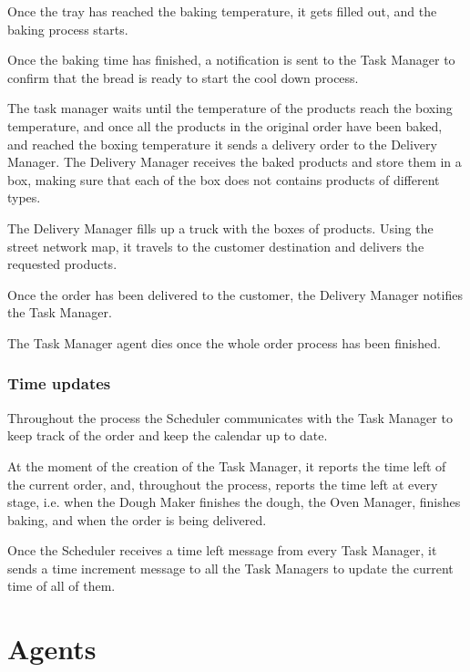 \documentclass[a4paper]{article}
\begin{document}
	Once the tray has reached the baking temperature, it gets filled out, and the baking process starts. 
	
	Once the baking time has finished, a notification is sent to the Task Manager to confirm that the bread is ready to start the cool down process. 
	
	The task manager waits until the temperature of the products reach the boxing temperature, and once all the products in the original order have been baked, and reached the boxing temperature it sends a delivery order to the Delivery Manager. The Delivery Manager receives the baked products and store them in a box, making sure that each of the box does not contains products of different types.
	
	The Delivery Manager fills up a truck with the boxes of products. Using the street network map, it travels to the customer destination and delivers the requested products. 
	
	Once the order has been delivered to the customer, the Delivery Manager notifies the Task Manager. 
	
	The Task Manager agent dies once the whole order process has been finished. 
	
	\subsubsection{Time updates}
	Throughout the process the Scheduler communicates with the Task Manager to keep track of the order and keep the calendar up to date. 
	
	At the moment of the creation of the Task Manager, it reports the time left of the current order, and, throughout the process, reports the time left at every stage, i.e. when the Dough Maker finishes the dough, the Oven Manager, finishes baking, and when the order is being delivered. 
	
	Once the Scheduler receives a time left message from every Task Manager, it sends a time increment message to all the Task Managers to update the current time of all of them. 	
	
	\newpage
	
	 \section{Agents}
	 
\end{document}
